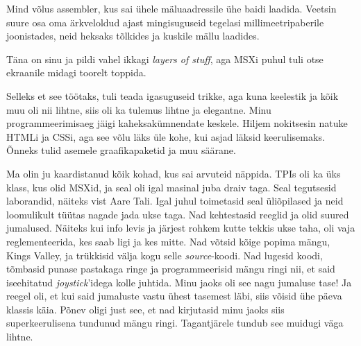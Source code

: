 Mind võlus assembler, kus sai ühele mäluaadressile ühe 
baidi laadida. Veetsin suure osa oma ärkveloldud 
ajast mingisuguseid tegelasi millimeetripaberile joonistades, neid heksaks 
tõlkides ja kuskile mällu laadides. 


Täna on sinu ja pildi vahel ikkagi \emph{layers of stuff}, aga MSXi puhul tuli otse ekraanile midagi
toorelt toppida. 


Selleks et see töötaks, tuli teada igasuguseid trikke, aga kuna keelestik ja 
kõik muu oli nii lihtne, siis oli ka tulemus lihtne ja elegantne. Minu
programmeerimisaeg jäigi kaheksakümnendate keskele. Hiljem nokitsesin
natuke HTMLi ja CSSi, aga see võlu läks üle kohe, kui asjad läksid keerulisemaks. Õnneks tulid asemele 
graafikapaketid ja muu säärane. 


Ma olin ju kaardistanud kõik kohad, kus sai arvuteid 
näppida. TPIs oli ka üks klass, kus olid 
MSXid, ja seal oli igal masinal juba draiv taga. 
Seal tegutsesid laborandid, näiteks vist Aare Tali. Igal juhul toimetasid seal 
üliõpilased ja neid loomulikult tüütas nagade jada ukse taga. Nad kehtestasid 
reeglid ja olid suured jumalused. Näiteks kui info levis ja järjest 
rohkem kutte tekkis ukse taha, oli vaja reglementeerida, kes saab 
ligi ja kes mitte. 
Nad võtsid kõige popima mängu, Kings Valley, ja trükkisid välja kogu selle 
\emph{source}-koodi. Nad lugesid koodi, tõmbasid punase pastakaga ringe ja programmeerisid mängu ringi nii, 
et said iseehitatud \emph{joystick}'idega kolle juhtida. Minu jaoks oli see nagu jumaluse tase! 
Ja reegel oli, et kui said 
jumaluste vastu ühest tasemest läbi, siis võisid ühe päeva klassis käia. Põnev oligi just see, et nad kirjutasid
minu jaoks siis superkeerulisena tundunud mängu ringi. Tagantjärele tundub see muidugi väga lihtne.


